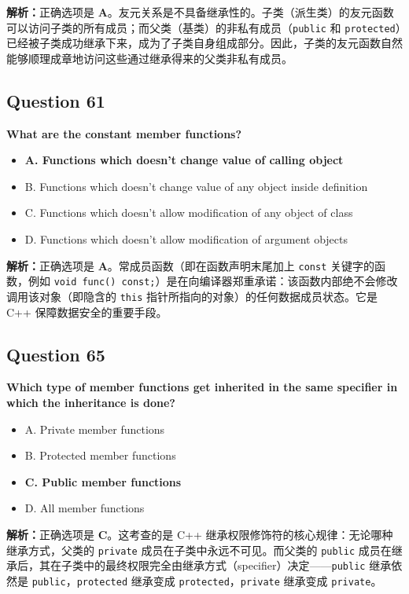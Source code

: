 \documentclass[11pt, a4paper]{article}
\begin{document}
\textbf{解析：}正确选项是 \textbf{A}。友元关系是不具备继承性的。子类（派生类）的友元函数可以访问子类的所有成员；而父类（基类）的非私有成员（\texttt{public} 和 \texttt{protected}）已经被子类成功继承下来，成为了子类自身组成部分。因此，子类的友元函数自然能够顺理成章地访问这些通过继承得来的父类非私有成员。

\subsection*{Question 61}
\textbf{What are the constant member functions?}
\begin{itemize}
    \item \textbf{A. Functions which doesn’t change value of calling object}
    \item B. Functions which doesn’t change value of any object inside definition
    \item C. Functions which doesn’t allow modification of any object of class
    \item D. Functions which doesn’t allow modification of argument objects
\end{itemize}

\textbf{解析：}正确选项是 \textbf{A}。常成员函数（即在函数声明末尾加上 \texttt{const} 关键字的函数，例如 \texttt{void func() const;}）是在向编译器郑重承诺：该函数内部绝不会修改调用该对象（即隐含的 \texttt{this} 指针所指向的对象）的任何数据成员状态。它是 C++ 保障数据安全的重要手段。


\subsection*{Question 65}
\textbf{Which type of member functions get inherited in the same specifier in which the inheritance is done?}
\begin{itemize}
    \item A. Private member functions
    \item B. Protected member functions
    \item \textbf{C. Public member functions}
    \item D. All member functions
\end{itemize}

\textbf{解析：}正确选项是 \textbf{C}。这考查的是 C++ 继承权限修饰符的核心规律：无论哪种继承方式，父类的 \texttt{private} 成员在子类中永远不可见。而父类的 \texttt{public} 成员在继承后，其在子类中的最终权限完全由继承方式（specifier）决定——\texttt{public} 继承依然是 \texttt{public}，\texttt{protected} 继承变成 \texttt{protected}，\texttt{private} 继承变成 \texttt{private}。
\end{document}
